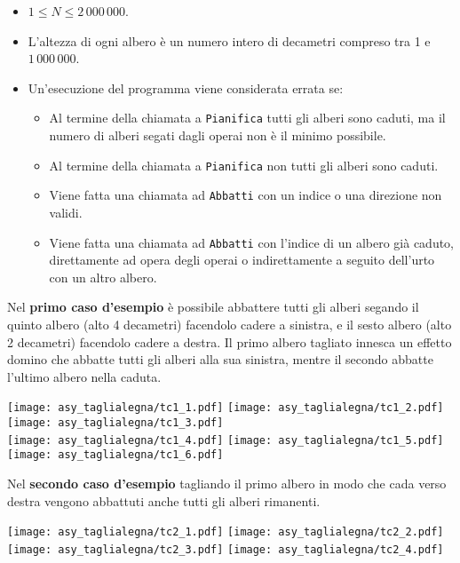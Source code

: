 \Constraints 
\begin{itemize}[nolistsep,itemsep=2mm]
  \item $1 \le {N} \le 2\,000\,000$.
  \item L'altezza di ogni albero è un numero intero di decametri compreso tra 1 e $1\,000\,000$.
  \item Un'esecuzione del programma viene considerata errata se:\begin{itemize}
  	\item Al termine della chiamata a \texttt{Pianifica} tutti gli alberi sono caduti, ma il numero di alberi segati dagli operai non è il minimo possibile.
  	\item Al termine della chiamata a \texttt{Pianifica} non tutti gli alberi sono caduti.
  	\item Viene fatta una chiamata ad \texttt{Abbatti} con un indice o una direzione non validi.
  	\item Viene fatta una chiamata ad \texttt{Abbatti} con l'indice di un albero già caduto, direttamente ad opera degli operai o indirettamente a seguito dell'urto con un altro albero.
  \end{itemize}
\end{itemize}


\Examples
\begin{example}
%
%
\end{example}


\Explanation
Nel \textbf{primo caso d'esempio} è possibile abbattere tutti gli alberi segando il quinto albero (alto 4 decametri) facendolo cadere a sinistra, e il sesto albero (alto 2 decametri) facendolo cadere a destra. Il primo albero tagliato innesca un effetto domino che abbatte tutti gli alberi alla sua sinistra, mentre il secondo abbatte l'ultimo albero nella caduta.
\begin{center}
	\def\sf{.83}
	\texttt{[image: asy\_taglialegna/tc1\_1.pdf]}\hfill
	\texttt{[image: asy\_taglialegna/tc1\_2.pdf]}\hfill
	\texttt{[image: asy\_taglialegna/tc1\_3.pdf]}\\[4mm]
	\texttt{[image: asy\_taglialegna/tc1\_4.pdf]}\hfill
	\texttt{[image: asy\_taglialegna/tc1\_5.pdf]}\hfill
	\texttt{[image: asy\_taglialegna/tc1\_6.pdf]}\\
\end{center}
\vspace{1cm}
Nel \textbf{secondo caso d'esempio} tagliando il primo albero in modo che cada verso destra vengono abbattuti anche tutti gli alberi rimanenti.
\begin{center}
	\def\sf{.83}
	\texttt{[image: asy\_taglialegna/tc2\_1.pdf]}\hfill
	\texttt{[image: asy\_taglialegna/tc2\_2.pdf]}\hfill
	\texttt{[image: asy\_taglialegna/tc2\_3.pdf]}\hfill
	\texttt{[image: asy\_taglialegna/tc2\_4.pdf]}
\end{center}
